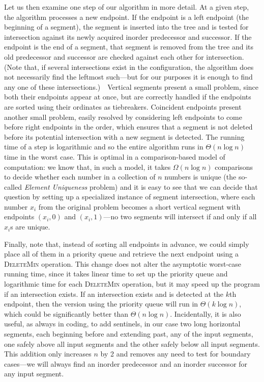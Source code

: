 \documentclass[11pt]{article}
\begin{document}
Let us then examine one step of our algorithm in more detail.  At a given step,
the algorithm processes a new endpoint.  If the endpoint is a left endpoint
(the beginning of a segment), the segment is inserted into the tree and is
tested for intersection against its newly acquired inorder predecessor and
successor.  If the endpoint is the end of a segment, that segment is removed
from the tree and its old predecessor and successor are checked against each
other for intersection.  (Note that, if several intersections exist in
the configuration, the algorithm does not necessarily find the leftmost
such---but for our purposes it is enough to find any one of these
intersections.)\ \ Vertical segments present a small problem, since both
their endpoints appear at once, but are correctly handled if the endpoints
are sorted using their ordinates as tiebreakers.  Coincident endpoints present
another small problem, easily resolved by considering left endpoints to come
before right endpoints in the order, which ensures that a segment is not
deleted before its potential intersection with a new segment is detected. 
The running time of a step is logarithmic and so the entire algorithm runs
in $\Theta(n\log n)$ time in the worst case.  This is optimal in
a comparison-based model of computation: we know that, in such a model,
it takes $\Omega(n\log n)$ comparisons to decide whether each number in
a collection of $n$ numbers is unique (the so-called \emph{Element Uniqueness}
problem) and it is easy to see that we can decide that question by setting
up a specialized instance of segment intersection, where each number $x_i$
from the original problem becomes a short vertical segment with endpoints
$(x_i,0)$ and $(x_i,1)$---no two segments will intersect if and only if
all $x_i$s are unique.

Finally, note that, instead of sorting all endpoints in advance, we could
simply place all of them in a priority queue and retrieve the next endpoint
using a \textsc{DeleteMin} operation.  This change does not alter the
asymptotic worst-case running time, since it takes linear time to set
up the priority queue and logarithmic time for each \textsc{DeleteMin}
operation, but it may speed up the program if an intersection exists.
If an intersection exists and is detected at the $k$th endpoint, then
the version using the priority queue will run in $\Theta(k\log n)$,
which could be significantly better than $\Theta(n\log n)$.
Incidentally, it is also useful, as always in coding, to add sentinels, 
in our case two long horizontal segments, each beginning before and extending
past, any of the input segments, one safely above all input segments and
the other safely below all input segments.  This addition only increases $n$
by 2 and removes any need to test for boundary cases---we will always
find an inorder predecessor and an inorder successor for any input segment.
\end{document}
